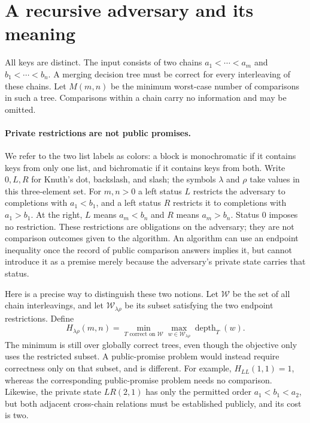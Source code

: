 \documentclass[11pt]{article}
\theoremstyle{definition}
\theoremstyle{remark}
\begin{document}
\section{A recursive adversary and its meaning}
\label{sec:game-definition}

All keys are distinct.  The input consists of two chains
$a_1<\cdots<a_m$ and $b_1<\cdots<b_n$.  A merging decision tree must be
correct for every interleaving of these chains.  Let $M(m,n)$ be the minimum
worst-case number of comparisons in such a tree.  Comparisons within a
chain carry no information and may be omitted.

\paragraph{Private restrictions are not public promises.}
We refer to the two list labels as colors: a block is monochromatic
if it contains keys from only one list, and bichromatic if it contains
keys from both. Write $0,L,R$ for Knuth's dot, backslash, and slash;
the symbols $\lambda$ and $\rho$ take values in this three-element set.  For $m,n>0$ a left
status $L$ restricts the adversary to completions with $a_1<b_1$, and a left
status $R$ restricts it to completions with $a_1>b_1$.  At the right, $L$
means $a_m<b_n$ and $R$ means $a_m>b_n$.  Status $0$ imposes no restriction.
These restrictions are obligations on the adversary; they are not
comparison outcomes given to the algorithm.  An algorithm can use an
endpoint inequality once the record of public comparison answers implies it, but
cannot introduce it as a premise merely because the adversary's private
state carries that status.

Here is a precise way to distinguish these two notions.  Let $\mathcal W$
be the set of all chain interleavings, and let $\mathcal W_{\lambda\rho}$
be its subset satisfying the two endpoint restrictions.  Define
\[
 H_{\lambda\rho}(m,n)
 =\min_{T\text{ correct on }\mathcal W}
       \max_{w\in\mathcal W_{\lambda\rho}}\operatorname{depth}_T(w).
\]
The minimum is still over globally correct trees, even though the
objective only uses the restricted subset.  A public-promise problem
would instead require correctness only on that subset, and is different.
For example, $H_{LL}(1,1)=1$, whereas the corresponding public-promise
problem needs no comparison.  Likewise, the private state $LR(2,1)$ has
only the permitted order $a_1<b_1<a_2$, but both adjacent cross-chain
relations must be established publicly, and its cost is two.
\end{document}
